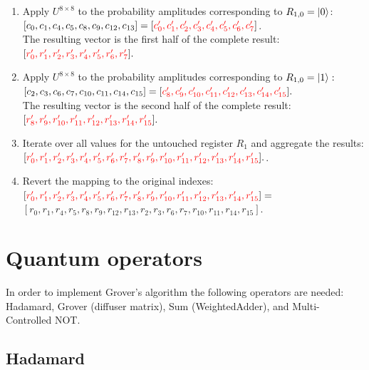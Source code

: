 \begin{enumerate}
    \item Apply $U^{8\times{}8}$ to the probability amplitudes corresponding to $R_{1,0} = \ket{0}$:\\
    $[c_0,c_1,c_4,c_5,c_8,c_9,c_{12},c_{13}] = [\color{red}c'_0,c'_1,c'_2,c'_3,c'_4,c'_5,c'_6,c'_7\color{black}]$.\\
    The resulting vector is the first half of the complete result:\\
    $[\color{red}r'_0,r'_1,r'_2,r'_3,r'_4,r'_5,r'_6,r'_7\color{black}].$
    \item Apply $U^{8\times{}8}$ to the probability amplitudes corresponding to $R_{1,0} = \ket{1}:$\\
    $[c_2,c_3,c_6,c_7,c_{10},c_{11},c_{14},c_{15}] = [\color{red}c'_8,c'_9,c'_{10},c'_{11},c'_{12},c'_{13},c'_{14},c'_{15}\color{black}].$\\
    The resulting vector is the second half of the complete result:\\
    $[\color{red}r'_8,r'_9,r'_{10},r'_{11},r'_{12},r'_{13},r'_{14},r'_{15}\color{black}].$
    \item Iterate over all values for the untouched register $R_1$ and aggregate the results:\\
     $[\color{red}r'_0,r'_1,r'_2,r'_3,r'_4,r'_5,r'_6,r'_7,r'_8,r'_9,r'_{10},r'_{11},r'_{12},r'_{13},r'_{14},r'_{15}\color{black}].$.
    \item Revert the mapping to the original indexes:\\ $[\color{red}r'_0,r'_1,r'_2,r'_3,r'_4,r'_5,r'_6,r'_7,r'_8,r'_9,r'_{10},r'_{11},r'_{12},r'_{13},r'_{14},r'_{15}\color{black}] =$\\
    $[r_0,r_1,r_4,r_5,r_8,r_9,r_{12},r_{13},r_2,r_3,r_6,r_7,r_{10},r_{11},r_{14},r_{15}].$
\end{enumerate}

\section{Quantum operators}

In order to implement Grover's algorithm the following operators are needed: Hadamard, Grover (diffuser matrix), Sum (WeightedAdder), and Multi-Controlled NOT.

\subsection{Hadamard}

